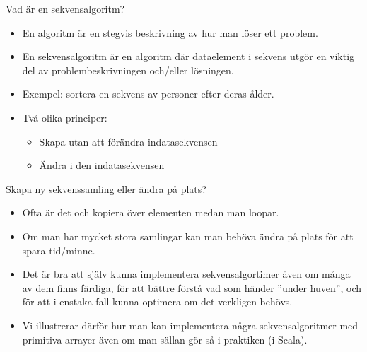 


\begin{Slide}{Vad är en sekvensalgoritm?}
\begin{itemize} 
\item En algoritm är en stegvis beskrivning av hur man löser ett problem. 
\item En sekvensalgoritm är en algoritm där dataelement i sekvens utgör en viktig del av problembeskrivningen och/eller lösningen.   

\item Exempel: sortera en sekvens av personer efter deras ålder.

\item Två olika principer:
\begin{itemize} 
\item Skapa  utan att förändra indatasekvensen
\item Ändra   i den  indatasekvensen
\end{itemize}
\end{itemize}

\end{Slide}

\begin{Slide}{Skapa ny sekvenssamling eller ändra på plats?}
\begin{itemize}
\item Ofta är det  och kopiera över elementen medan man loopar.
\item Om man har mycket stora samlingar kan man behöva ändra på plats för att spara tid/minne.
\item Det är bra att själv kunna implementera sekvensalgortimer även om många av dem finns färdiga, för att bättre förstå vad som händer ''under huven'', och för att i enstaka fall kunna optimera om det verkligen behövs.
\item Vi illustrerar därför hur man kan implementera några sekvensalgoritmer med primitiva arrayer även om man sällan gör så i praktiken (i Scala).
\end{itemize}
\end{Slide}



